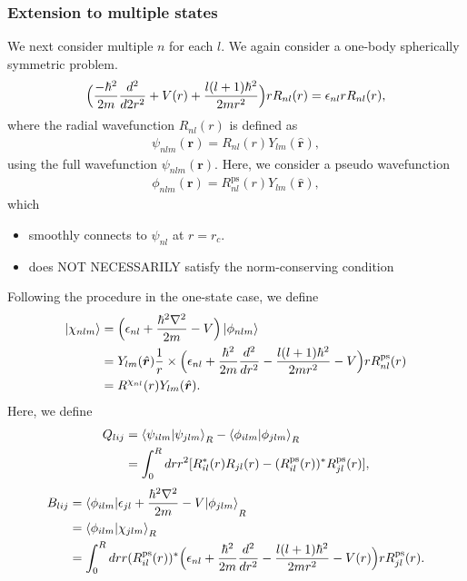 \documentclass{article}
\begin{document}
\subsubsection{Extension to multiple states}
We next consider multiple $n$ for each $l$.
We again consider a one-body spherically symmetric problem.
\begin{align}
  \Bigl(
    \frac{-\hbar^2}{2m} \frac{d^2}{d2r^2}
    + V(r)
    + \frac{l(l+1)\hbar^2}{2mr^2} 
  \Bigr)r R_{nl}(r)
  = 
  \epsilon_{nl} r R_{nl}(r),
\end{align}
where the radial wavefunction $R_{nl}(r)$ is defined as 
\begin{align}
  \psi_{nlm}(\bm{r}) = R_{nl}(r) Y_{lm}(\hat{\bm{r}}),
\end{align}
using the full wavefunction $\psi_{nlm}(\bm{r})$.
Here, we consider a pseudo wavefunction 
\begin{align}
  \phi_{nlm}(\bm{r}) = R^{\text{ps}}_{nl}(r) Y_{lm}(\hat{\bm{r}}),
\end{align}
which 
\begin{itemize}
  \item smoothly connects to $\psi_{nl}$ at $r = r_c$.
  \item does NOT NECESSARILY satisfy the norm-conserving condition
\end{itemize}
Following the procedure in the one-state case, we define
\begin{align}
  \ket{\chi_{nlm}} 
  &= \Bigl(\epsilon_{nl} + \frac{\hbar^2\nabla^2}{2m} - V \Bigr)\ket{\phi_{nlm}}
  \nonumber
  \\&=
  Y_{lm}(\hat{\bm{r}})
  \frac{1}{r}
  \times
  \Bigl(\epsilon_{nl} + \frac{\hbar^2}{2m} \frac{d^2}{dr^2} - \frac{l(l+1)\hbar^2}{2mr^2} - V \Bigr) r R^{\text{ps}}_{nl}(r)
  \nonumber
  \\&= 
  R^{\chi_{nl}}(r) Y_{lm}(\hat{\bm{r}}).
\end{align}
Here, we define 
\begin{align}
  Q_{lij} 
  &= 
  \braket{\psi_{ilm} | \psi_{jlm}}_R - \braket{\phi_{ilm} | \phi_{jlm}}_R 
  \nonumber
  \\&=
  \int_0^R dr r^2 [ R_{il}^*(r) R_{jl}(r) - (R^{\text{ps}}_{il}(r))^* R^{\text{ps}}_{jl}(r) ],
\end{align}
\begin{align}
  B_{lij} 
  &= 
   \braket{\phi_{ilm} | \epsilon_{jl} + \frac{\hbar^2\nabla^2}{2m} - V|\phi_{jlm}}_R 
  \nonumber
  \\&=
  \braket{\phi_{ilm} | \chi_{jlm}}_R 
  \nonumber
  \\&=
  \int_0^R dr 
  r(R^{\text{ps}}_{il}(r))^* 
  \Bigl(
    \epsilon_{nl} + \frac{\hbar^2}{2m} \frac{d^2}{dr^2} - \frac{l(l+1)\hbar^2}{2mr^2} - V(r)
  \Bigr)
  r R^{\text{ps}}_{jl}(r).
\end{align}
\end{document}
